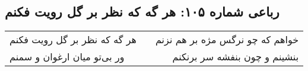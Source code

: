 \begin{center}
\section*{رباعی شماره ۱۰۵: هر گه که نظر بر گل رویت فکنم}
\label{sec:105}
\begin{longtable}{l p{0.5cm} r}
هر گه که نظر بر گل رویت فکنم
&&
خواهم که چو نرگس مژه بر هم نزنم
\\
ور بی‌تو میان ارغوان و سمنم
&&
بنشینم و چون بنفشه سر برنکنم
\\
\end{longtable}
\end{center}
